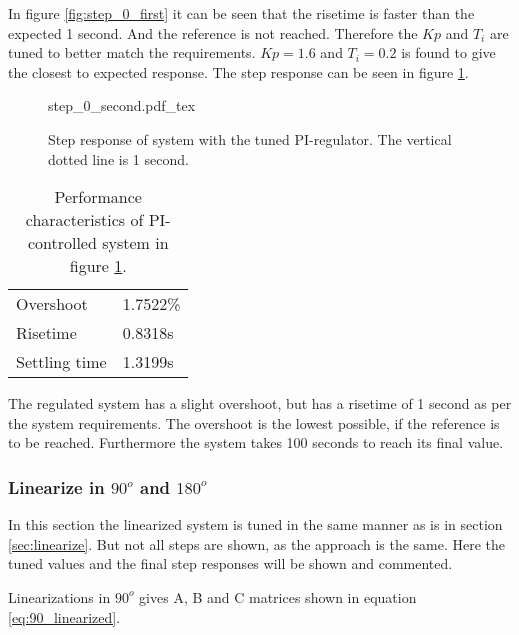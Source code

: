 \documentclass[../../../Main]{subfiles}
\begin{document}
In figure \ref{fig:step_0_first} it can be seen that the risetime is faster than the expected 1 second. And the reference is not reached. Therefore the $Kp$ and $T_i$ are tuned to better match the requirements. $Kp = 1.6$ and $T_i=0.2$ is found to give the closest to expected response. The step response can be seen in figure \ref{fig:step_0_second}.

\begin{figure}[H]
\centering
\def\svgwidth{\textwidth}
{step_0_second.pdf_tex}
\caption{Step response of system with the tuned PI-regulator. The vertical dotted line is 1 second.}
\label{fig:step_0_second}
\end{figure}


\begin{table}[h]
	 \centering
	 \begin{tabular}{ll}
		 Overshoot & 1.7522\%\\
		 Risetime  & 0.8318s\\
		 Settling time & 1.3199s
	 \end{tabular}
	 \caption{Performance characteristics of PI-controlled system in figure \ref{fig:step_0_second}.}
	 \label{tab:performance_0_2}
\end{table}



The regulated system has a slight overshoot, but has a risetime of 1 second as per the system requirements. The overshoot is the lowest possible, if the reference is to be reached. Furthermore the system takes 100 seconds to reach its final value.

\subsubsection{Linearize in $90^o$ and $180^o$}
In this section the linearized system is tuned in the same manner as is in section \ref{sec:linearize}. But not all steps are shown, as the approach is the same. Here the tuned values and the final step responses will be shown and commented.

Linearizations in $90^o$ gives A, B and C matrices shown in equation \ref{eq:90_linearized}.
\end{document}

